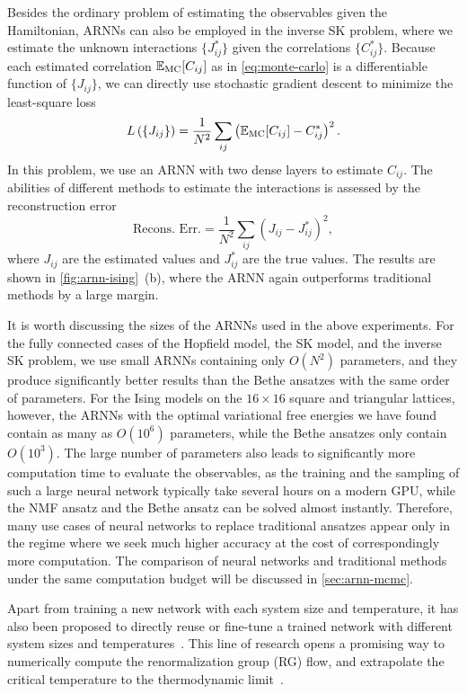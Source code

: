 Besides the ordinary problem of estimating the observables given the Hamiltonian, ARNNs can also be employed in the inverse SK problem, where we estimate the unknown interactions $\{J^*_{i j}\}$ given the correlations $\{C^*_{i j}\}$. Because each estimated correlation $\mathbb{E}_\text{MC}[C_{i j}]$ as in \cref{eq:monte-carlo} is a differentiable function of $\{J_{i j}\}$, we can directly use stochastic gradient descent to minimize the least-square loss
\begin{equation}
L\left( \{J_{i j}\} \right) = \frac{1}{N^2} \sum_{i j} \left( \mathbb{E}_\text{MC}[C_{i j}] - C^*_{i j} \right)^2.
\end{equation}
In this problem, we use an ARNN with two dense layers to estimate $C_{i j}$. The abilities of different methods to estimate the interactions is assessed by the reconstruction error
\begin{equation}
\text{Recons. Err.} = \frac{1}{N^2} \sum_{i j} \left( J_{i j} - J^*_{i j} \right)^2,
\end{equation}
where $J_{i j}$ are the estimated values and $J^*_{i j}$ are the true values. The results are shown in \cref{fig:arnn-ising}~(b), where the ARNN again outperforms traditional methods by a large margin.

It is worth discussing the sizes of the ARNNs used in the above experiments. For the fully connected cases of the Hopfield model, the SK model, and the inverse SK problem, we use small ARNNs containing only $O(N^2)$ parameters, and they produce significantly better results than the Bethe ansatzes with the same order of parameters. For the Ising models on the $16 \times 16$ square and triangular lattices, however, the ARNNs with the optimal variational free energies we have found contain as many as $O(10^6)$ parameters, while the Bethe ansatzes only contain $O(10^3)$. The large number of parameters also leads to significantly more computation time to evaluate the observables, as the training and the sampling of such a large neural network typically take several hours on a modern GPU, while the NMF ansatz and the Bethe ansatz can be solved almost instantly. Therefore, many use cases of neural networks to replace traditional ansatzes appear only in the regime where we seek much higher accuracy at the cost of correspondingly more computation. The comparison of neural networks and traditional methods under the same computation budget will be discussed in \cref{sec:arnn-mcmc}.

Apart from training a new network with each system size and temperature, it has also been proposed to directly reuse or fine-tune a trained network with different system sizes and temperatures~\cite{efthymiou2019super, mills2019extensive, rende2024fine}. This line of research opens a promising way to numerically compute the renormalization group (RG) flow, and extrapolate the critical temperature to the thermodynamic limit~\cite{ron2002inverse}.

